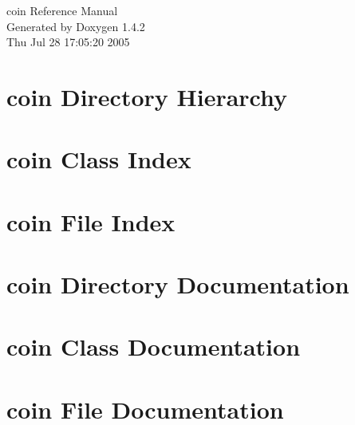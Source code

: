 \documentclass[a4paper]{book}
\begin{document}
\begin{titlepage}
\vspace*{7cm}
\begin{center}
{\Large coin Reference Manual}\\
\vspace*{1cm}
{\large Generated by Doxygen 1.4.2}\\
\vspace*{0.5cm}
{\small Thu Jul 28 17:05:20 2005}\\
\end{center}
\end{titlepage}
\clearemptydoublepage
{}
\tableofcontents
\clearemptydoublepage
{}
\chapter{coin Directory Hierarchy}

\chapter{coin Class Index}

\chapter{coin File Index}

\chapter{coin Directory Documentation}

\chapter{coin Class Documentation}

\chapter{coin File Documentation}














\printindex
\end{document}
